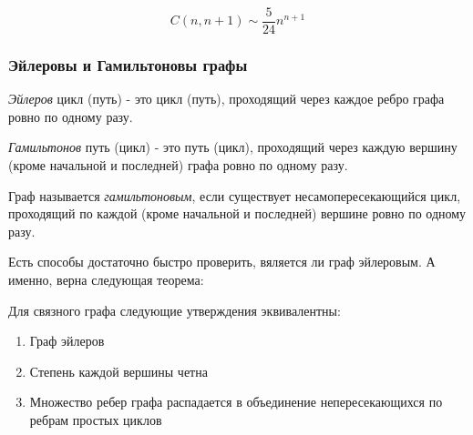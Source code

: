 \begin{theorem}[б/д]
	$$C(n, n+1) \sim \frac{5}{24}n^{n+1}$$
\end{theorem}


\subsubsection{Эйлеровы и Гамильтоновы графы}

\begin{Def}
	\emph{Эйлеров} цикл (путь) - это цикл (путь), проходящий через каждое ребро графа ровно по одному разу.
\end{Def}

\begin{Def}
	\emph{Гамильтонов} путь (цикл) - это путь (цикл), проходящий через каждую вершину (кроме начальной и последней) графа ровно по одному разу.
\end{Def}

\begin{Def}
	Граф называется \emph{гамильтоновым}, если существует несамопересекающийся цикл, проходящий по каждой (кроме начальной и последней) вершине ровно по одному разу.
\end{Def}

Есть способы достаточно быстро проверить, вяляется ли граф эйлеровым. А именно, верна следующая теорема:

\begin{theorem}
	Для связного графа следующие утверждения эквивалентны:
	\begin{enumerate}
		\item Граф эйлеров
		\item Степень каждой вершины четна
		\item Множество ребер графа распадается в объединение непересекающихся по ребрам простых циклов
	\end{enumerate}
\end{theorem}

